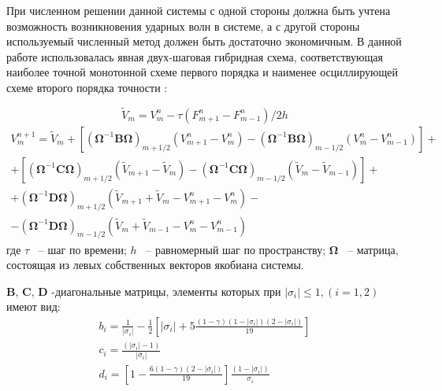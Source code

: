 При численном решении данной системы с одной стороны должна быть учтена возможность возникновения ударных волн в системе, а с другой стороны используемый численный метод должен быть достаточно экономичным. В данной работе использовалась явная двух-шаговая гибридная схема, соответствующая наиболее точной монотонной схеме первого порядка и наименее осциллирующей схеме второго порядка точности \cite{Magomedov1988}:

\begin{equation}
\tilde{V}_{m} =V_{m}^{n} -\tau \left(F_{m+1}^{n} -F_{m-1}^{n} \right)/2h
\end{equation} 
\begin{equation}
\begin{array}{l} 
{V_{m}^{n+1} =\tilde{V}_{m} +\left[\left(\mathbf{\Omega} ^{-1} \mathbf{B}\mathbf{\Omega} \right)_{m+1/2} \left(V_{m+1}^{n} -V_{m}^{n} \right)-\left(\mathbf{\Omega} ^{-1} \mathbf{B}\mathbf{\Omega} \right)_{m-1/2} \left(V_{m}^{n} -V_{m-1}^{n} \right)\right]+} \\ {+\left[\left(\mathbf{\Omega} ^{-1} \mathbf{C}\mathbf{\Omega} \right)_{m+1/2} \left(\tilde{V}_{m+1} -\tilde{V}_{m} \right)-\left(\mathbf{\Omega} ^{-1} \mathbf{C}\mathbf{\Omega} \right)_{m-1/2} \left(\tilde{V}_{m} -\tilde{V}_{m-1} \right)\right]+} \\ {+\left(\mathbf{\Omega} ^{-1} \mathbf{D}\mathbf{\Omega} \right)_{m+1/2} \left(\tilde{V}_{m+1} +\tilde{V}_{m} -V_{m+1}^{n} -V_{m}^{n} \right)-} \\ {-\left(\mathbf{\Omega} ^{-1} \mathbf{D}\mathbf{\Omega} \right)_{m-1/2} \left(\tilde{V}_{m} +\tilde{V}_{m-1} -V_{m}^{n} -V_{m-1}^{n} \right)} 
\end{array}
\end{equation}
где $\tau $ ~-- шаг по времени; $h $ ~-- равномерный шаг по пространству; $\mathbf{\Omega}$ ~-- матрица, состоящая из левых собственных векторов якобиана системы.

$ \mathbf{B}$, $\mathbf{C}$, $\mathbf{D}$ -диагональные матрицы, элементы которых при $\left|\sigma _{i} \right|\le 1,(i=1,2)$ имеют вид:
\begin{equation}
\begin{array}{l} \displaystyle {b_{i} =\frac{1}{\left|\sigma _{i} \right|} -\frac{1}{2} \left[\left|\sigma _{i} \right|+5\frac{\left(1-\gamma \right)\left(1-\left|\sigma _{i} \right|\right)\left(2-\left|\sigma _{i} \right|\right)}{19} \right]} \\ \displaystyle {c_{i} =\frac{\left(\left|\sigma _{i} \right|-1\right)}{\left|\sigma _{i} \right|} } \\ \displaystyle {d_{i} =\left[1-\frac{6\left(1-\gamma \right)\left(2-\left|\sigma _{i} \right|\right)}{19} \right]\frac{\left(1-\left|\sigma _{i} \right|\right)}{\sigma _{i} } } \end{array}
\end{equation}

